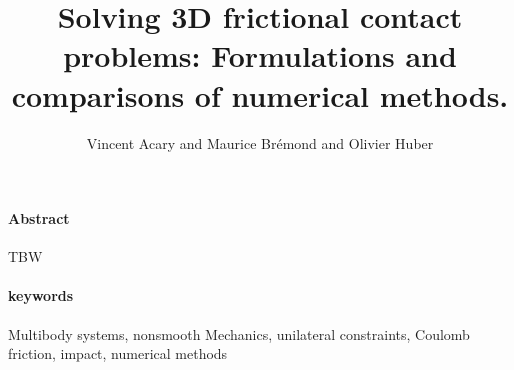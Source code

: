 \documentclass[10pt,a4paper]{article}
\title{Solving 3D frictional contact problems: Formulations and comparisons of numerical methods.}
\author{Vincent Acary and Maurice Br\'emond and Olivier Huber}
\begin{document}
\maketitle
\tableofcontents
\clearpage
{\paragraph{Abstract} TBW}

{\paragraph{keywords} Multibody systems, nonsmooth Mechanics,  unilateral constraints, Coulomb friction, impact, numerical methods}




\end{document}
